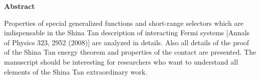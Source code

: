 \begin{center}
\begin{LARGE}\textbf{Abstract}\end{LARGE}
\end{center}

\vspace{1.0cm}

Properties of special generalized functions and short-range selectors which are indispensable in the Shina Tan description of interacting Fermi systems [Annals of Physics 323, 2952 (2008)] are analyzed in details. Also all details of the proof of the Shina Tan energy theorem and properties of the contact are presented. The manuscript should be interesting for researchers who want to understand all elements of the Shina Tan extraordinary work.
